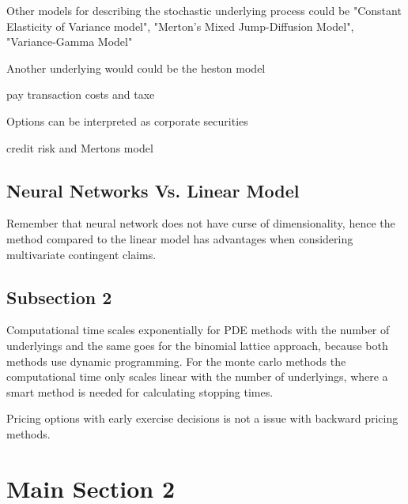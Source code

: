 Other models for describing the stochastic underlying process could be "Constant Elasticity of Variance model", "Merton's Mixed Jump-Diffusion Model", "Variance-Gamma Model"

Another underlying would could be the heston model

pay transaction costs and taxe

Options can be interpreted as corporate securities

credit risk and Mertons model


\subsection{Neural Networks Vs. Linear Model}
Remember that neural network does not have curse of dimensionality, hence the method compared to the linear model has advantages when considering multivariate contingent claims.


\subsection{Subsection 2}
Computational time scales exponentially for PDE methods with the number of underlyings and the same goes for the binomial lattice approach, because both methods use dynamic programming. For the monte carlo methods the computational time only scales linear with the number of underlyings, where a smart method is needed for calculating stopping times.

Pricing options with early exercise decisions is not a issue with backward pricing methods.


\section{Main Section 2}
